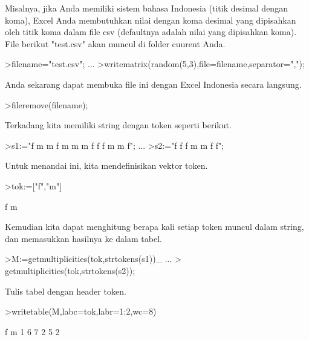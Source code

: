\documentclass[a4paper,10pt]{article}
\begin{document}
\begin{eulernotebook}
\begin{eulercomment}
\begin{eulercomment}
\begin{eulercomment}
\begin{eulercomment}
\begin{eulercomment}
\begin{eulercomment}
\begin{eulercomment}
Misalnya, jika Anda memiliki sistem bahasa Indonesia (titik desimal
dengan koma), Excel Anda membutuhkan nilai dengan koma desimal yang
dipisahkan oleh titik koma dalam file csv (defaultnya adalah nilai
yang dipisahkan koma). File berikut "test.csv" akan muncul di folder
cuurent Anda.
\end{eulercomment}
\begin{eulerprompt}
>filename="test.csv"; ...
>writematrix(random(5,3),file=filename,separator=",");
\end{eulerprompt}
\begin{eulercomment}
Anda sekarang dapat membuka file ini dengan Excel Indonesia secara
langsung.
\end{eulercomment}
\begin{eulerprompt}
>fileremove(filename);
\end{eulerprompt}
\begin{eulercomment}
Terkadang kita memiliki string dengan token seperti berikut.
\end{eulercomment}
\begin{eulerprompt}
>s1:="f m m f m m m f f f m m f";  ...
>s2:="f f f m m f f";
\end{eulerprompt}
\begin{eulercomment}
Untuk menandai ini, kita mendefinisikan vektor token.
\end{eulercomment}
\begin{eulerprompt}
>tok:=["f","m"]
\end{eulerprompt}
\begin{euleroutput}
  f
  m
\end{euleroutput}
\begin{eulercomment}
Kemudian kita dapat menghitung berapa kali setiap token muncul dalam
string, dan memasukkan hasilnya ke dalam tabel.
\end{eulercomment}
\begin{eulerprompt}
>M:=getmultiplicities(tok,strtokens(s1))_ ...
>  getmultiplicities(tok,strtokens(s2));
\end{eulerprompt}
\begin{eulercomment}
Tulis tabel dengan header token.
\end{eulercomment}
\begin{eulerprompt}
>writetable(M,labc=tok,labr=1:2,wc=8)
\end{eulerprompt}
\begin{euleroutput}
                 f       m
         1       6       7
         2       5       2
\end{euleroutput}

\end{eulercomment}
\end{eulercomment}
\end{eulercomment}
\end{eulercomment}
\end{eulercomment}
\end{eulercomment}
\end{eulernotebook}
\end{document}
